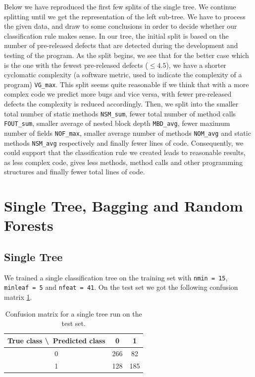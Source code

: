 \documentclass[a4paper,11pt]{article}
\begin{document}
 Below we have reproduced the first few splits of the single tree. We continue splitting until we get the representation of the left sub-tree. We have to process the given data, and draw to some conclusions in order to decide whether our classification rule makes sense. In our tree, the initial split is based on the number of pre-released defects that are detected during the development and testing of the program. As the split begins, we see that for the better case which is the one with the fewest pre-released defects ($\leq 4.5$), we have a shorter cyclomatic complexity (a software metric, used to indicate the complexity of a program) \verb|VG_max|. This split seems quite reasonable if we think that with a more complex code we predict more bugs and vice versa, with fewer pre-released defects the complexity is reduced accordingly. Then, we split into the smaller total number of static methods \verb|NSM_sum|, fewer total number of method calls \verb|FOUT_sum|, smaller average of nested block depth \verb|MBD_avg|, fewer maximum number of fields \verb|NOF_max|, smaller average number of methods \verb|NOM_avg| and static methods \verb|NSM_avg| respectively and finally fewer lines of code. Consequently, we could support that the classification rule we created leads to reasonable results, as less complex code, gives less methods, method calls and other programming structures and finally fewer total lines of code. 

\section{Single Tree, Bagging and Random Forests}

\subsection{Single Tree}
We trained a single classification tree on the training set with \verb|nmin = 15|, \verb|minleaf = 5| and \verb|nfeat = 41|. On the test set we got the following confusion matrix \ref{tab: singletree}.
 
\begin{table}[h!]
\centering
	\begin{tabular}{c||c|c}
	True class \textbackslash\ Predicted class & 0 & 1 \\ \hline \hline
	0 & 266 & 82 \\ \hline
	1 & 128 & 185
	\end{tabular}
	\caption{Confusion matrix for a single tree run on the test set.}
	\label{tab: singletree}
\end{table}
\end{document}

